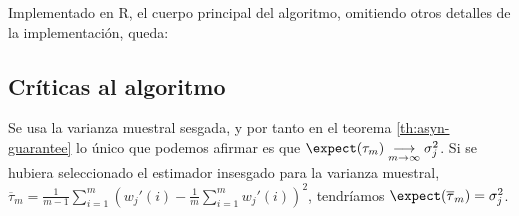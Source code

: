 Implementado en R, el cuerpo principal del algoritmo, omitiendo otros detalles de la implementación, queda:



\subsection{Críticas al algoritmo}
Se usa la varianza muestral sesgada, y por tanto en el teorema \ref{th:asyn-guarantee} lo único que podemos afirmar es que
$\expect(\tau_m) \underset{m\rightarrow \infty}{\longrightarrow} \sigma_j^2$. Si se hubiera seleccionado el estimador
insesgado para la varianza muestral, $\overline{\tau}_m = \frac{1}{m-1} \sum_{i=1}^m \left(w_j'(i) - \frac{1}{m} \sum_{i=1}^m w_j'(i)\right)^2$,
tendríamos $\expect(\overline{\tau}_m) = \sigma_j^2$.